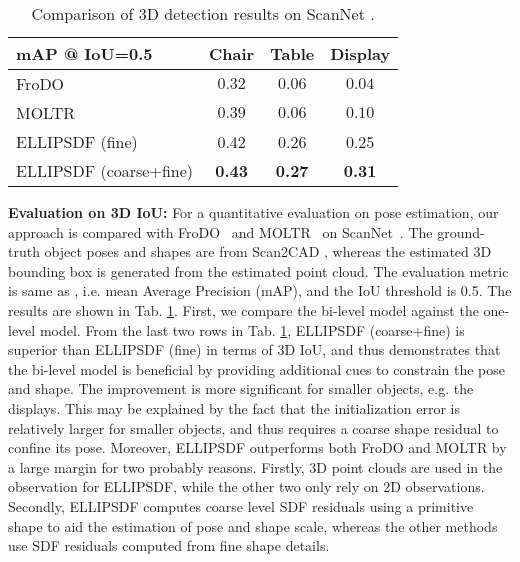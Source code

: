 \begin{table}[t]
\centering
\caption{Comparison of 3D detection results on ScanNet \cite{dai2017scannet}.}
\small
    \begin{tabular}{l|c|c|c} %
    \hline
    mAP @ IoU=0.5 & Chair & Table & Display \\
    \hline\hline
    FroDO \cite{runz2020frodo} & $0.32$ & $0.06$ & $0.04$\\
    MOLTR \cite{li2020mo} & $0.39$ & $0.06$ & $0.10$ \\
    ELLIPSDF (fine) & 0.42 & 0.26 & 0.25 \\
    ELLIPSDF (coarse+fine) & \bf{0.43} & \bf{0.27} & \bf{0.31} \\
    \hline
    \end{tabular}
    \vspace{0.2cm}
    \label{tab:detection_moltr}
\end{table}

{\vspace{1ex}\bf \noindent Evaluation on 3D IoU: }%
For a quantitative evaluation on pose estimation, our approach is compared with FroDO~\cite{runz2020frodo} and MOLTR~\cite{li2020mo} on ScanNet~\cite{dai2017scannet}. The ground-truth object poses and shapes are from Scan2CAD \cite{avetisyan2019scan2cad}, whereas the estimated 3D bounding box is generated from the estimated point cloud.
The evaluation metric is same as \cite{li2020mo}, i.e. mean Average Precision (mAP), and the IoU threshold is 0.5. The results are shown in Tab. \ref{tab:detection_moltr}. 
First, we compare the bi-level model against the one-level model. From the last two rows in Tab. \ref{tab:detection_moltr}, ELLIPSDF (coarse+fine) is superior than ELLIPSDF (fine) in terms of 3D IoU, and thus demonstrates that the bi-level model is beneficial by providing additional cues to constrain the pose and shape. The improvement is more significant for smaller objects, e.g. the displays. This may be explained by the fact that the initialization error is relatively larger for smaller objects, and thus requires a coarse shape residual to confine its pose. 
Moreover, ELLIPSDF outperforms both FroDO and MOLTR by a large margin for two probably reasons. Firstly, 3D point clouds are used in the observation for ELLIPSDF, while the other two only rely on 2D observations. Secondly, ELLIPSDF computes coarse level SDF residuals using a primitive shape to aid the estimation of pose and shape scale, whereas the other methods use SDF residuals computed from fine shape details. 
